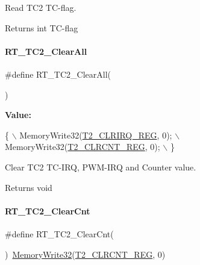 Read T\+C2 T\+C-\/flag. 

\begin{DoxyReturn}{Returns}
int T\+C-\/flag 
\end{DoxyReturn}
\mbox{\label{a00083_a6b71644043f022558ee65f6197d0fe5d}} 
\paragraph{\texorpdfstring{R\+T\+\_\+\+T\+C2\+\_\+\+Clear\+All}{RT\_TC2\_ClearAll}}
{\footnotesize\ttfamily \#define R\+T\+\_\+\+T\+C2\+\_\+\+Clear\+All(\begin{DoxyParamCaption}{ }\end{DoxyParamCaption})}

{\bfseries Value\+:}
\begin{DoxyCode}
\{                                    \(\backslash\)
        MemoryWrite32(\mbox{\hyperlink{a00026_aba8ec9cd37a1487a613cca0194e62f15}{T2\_CLRIRQ\_REG}}, 0); \(\backslash\)
        MemoryWrite32(\mbox{\hyperlink{a00026_adbe130a3cc7c3109bab2ae344fcdcc11}{T2\_CLRCNT\_REG}}, 0); \(\backslash\)
    \}
\end{DoxyCode}


Clear T\+C2 T\+C-\/\+I\+RQ, P\+W\+M-\/\+I\+RQ and Counter value. 

\begin{DoxyReturn}{Returns}
void 
\end{DoxyReturn}
\mbox{\label{a00083_ab1818ddcd1db9a3582f3bc37e1d62881}} 
\paragraph{\texorpdfstring{R\+T\+\_\+\+T\+C2\+\_\+\+Clear\+Cnt}{RT\_TC2\_ClearCnt}}
{\footnotesize\ttfamily \#define R\+T\+\_\+\+T\+C2\+\_\+\+Clear\+Cnt(\begin{DoxyParamCaption}{ }\end{DoxyParamCaption})~\mbox{\hyperlink{a00026_a6b9732365b12e48ddb89fe1028b975b0}{Memory\+Write32}}(\mbox{\hyperlink{a00026_adbe130a3cc7c3109bab2ae344fcdcc11}{T2\+\_\+\+C\+L\+R\+C\+N\+T\+\_\+\+R\+EG}}, 0)}



